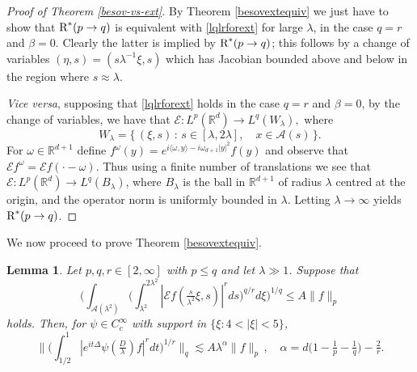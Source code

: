 \documentclass[11pt]{amsart}
\newtheorem{lemma}[theorem]{Lemma}
\theoremstyle{definition}
\numberwithin{theorem}{section}
\numberwithin{definition}{section}
\numberwithin{equation}{section}
\def\Hyp{{\cH}}
\def\inn#1#2{\langle#1,#2\rangle}
\newcommand{\Be}{\begin{equation}}
\newcommand{\Ee}{\end{equation}}
\renewcommand{\le}{\leqslant}
\renewcommand{\ge}{\geqslant}
\def\inn#1#2{\langle#1,#2\rangle}
\def\lc{\lesssim}
\def\la{\lambda}             \def\La{\Lambda}
\def\bbR{{\mathbb {R}}}
\def\cA{{\mathcal {A}}}
\def\cE{{\mathcal {E}}}
\def\cH{{\mathcal {H}}}
\renewcommand{\le}{\leqslant}
\renewcommand{\ge}{\geqslant}
\begin{document}
\begin{proof}[Proof of Theorem \ref{besov-vs-ext}]
 By Theorem
\ref{besovextequiv} we just have to show that $\text{\rm R}^*(p\to
q)$ is equivalent with \eqref{lqlrforext} for large $\la$, in the
case $q=r$ and $\beta=0$. Clearly the latter is implied by
$\text{\rm R}^*(p\to q)$; this follows by a change of variables
$(\eta, s )= ( s \lambda^{-1}\xi,  s )$ which has Jacobian
bounded above and below in the  region where $ s \approx\lambda$.

{\it Vice versa},  supposing that \eqref{lqlrforext} holds in the case $q=r$ and
$\beta=0$, by the change of variables, we have that $\cE: L^p(\bbR^d)\to
L^q(W_\lambda),$ where
$$W_\lambda=\{\,(\xi, s )\, :\,  s \in [\lambda,2\lambda],\quad x\in \cA( s )\,\}.$$ For
$\omega\in \bbR^{d+1}$ define $f^\omega(y)= e^{i \inn \omega y
-i\omega_{d+1}|y|^2} f(y)$ and observe that $\cE f^\omega=\cE
f(\cdot-\omega)$. Thus using  a finite number of translations we see
that
  $\cE: L^p(\bbR^d)\to L^q(B_\la)$,  where $B_\lambda$ is the ball in $\bbR^{d+1}$
of radius  $\lambda$ centred at the origin, and the operator norm
is uniformly bounded in $\lambda$. Letting $\lambda\to\infty$ yields
$\text{\rm R}^*(p\to q)$.
\end{proof}

We now proceed to prove Theorem \ref{besovextequiv}.


\begin{lemma} \label{resimpliesSchr} Let $p,q,r\in [2,\infty]$ with $p\le
q$ and let $\la\gg 1$.
Suppose that
 \Be\label{adjrestrassu}
\Big(\int_{\cA(\la^2)} \Big(\int_{\la^2}^{2\la^2}
  |\cE f(\tfrac{ s }{\la^2}\xi,  s )
|^r d s \Big)^{q/r} d\xi\Big)^{1/q} \le A\|f\|_p \Ee holds. Then, for  $\psi\in C^\infty_c$ with support in
$\{\xi:4<|\xi|<5\}$,
\begin{equation}\label{fixedfr}
\Big\|\Big(\int_{1/2}^1| e^{it\Delta} \psi(\tfrac D\la ) f|^r dt\Big)^{1/r}
 \Big\|_q\lc A  \la^{\alpha} \|f\|_{p}\,,\quad  \alpha = d\big(1-\tfrac 1p-\tfrac 1q\big)-\tfrac 2r.
\end{equation}

\end{lemma}
\end{document}
